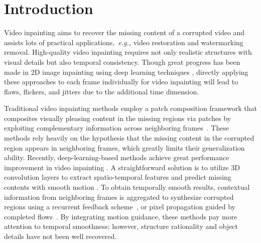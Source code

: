 

\section{Introduction}


Video inpainting aims to recover the missing content of a corrupted video and assists lots of practical applications,~\emph{e.g.,} video restoration and watermarking removal. 
High-quality video inpainting requires not only realistic structures with visual details but also temporal consistency. 
% 
Though great progress has been made in 2D image inpainting using deep learning techniques \cite{yu2018free,Xiong_2019_CVPR,wang2018high}, directly applying these approaches to each frame individually for video inpainting will lead to flaws, flickers, and jitters due to the additional time dimension. 





Traditional video inpainting methods employ a patch composition framework that composites visually pleasing content in the missing regions via patches by exploiting complementary information across neighboring frames~\cite{patwardhan2007video,wexler2004space,newson2014video}.
% 
These methods rely heavily on the hypothesis that the missing content in the corrupted region appears in neighboring frames, which greatly limits their generalization ability.
%
Recently, deep-learning-based methods achieve great performance improvement in video inpainting \cite{wang2019video,Kim_2019_CVPR1,Xu_2019_CVPR,Kim_2019_CVPR}.
A straightforward solution is to utilize 3D convolution layers to extract spatio-temporal features and predict missing contents with smooth motion \cite{wang2019video}.
To obtain temporally smooth results, contextual information from neighboring frames is aggregated to synthesize corrupted regions using a recurrent feedback scheme~\cite{Kim_2019_CVPR1,Kim_2019_CVPR}, or pixel propagation guided by completed flows~\cite{Xu_2019_CVPR}. 
By integrating motion guidance, these methods pay more attention to temporal smoothness; however, structure rationality and object details have not been well recovered. 


